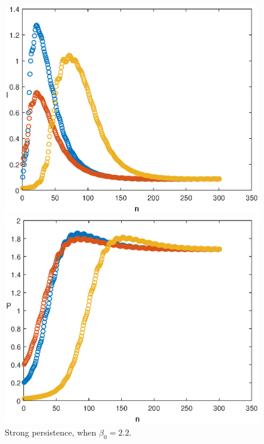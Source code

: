 \documentclass[reqno]{amsart}
\begin{document}
{{\begin{figure}
\begin{minipage}[b]{.32\linewidth}
  \end{minipage}
  \begin{minipage}[b]{.32\linewidth}
        \includegraphics[width=\linewidth]{Infected_PERS_PER.eps}
  \end{minipage}
  \begin{minipage}[b]{.32\linewidth}
        \includegraphics[width=\linewidth]{Predator_PERS_PER.eps}
  \end{minipage}
    \caption{Strong persistence, when $\beta_0=2.2$.}
      \label{fig-no-periodic-DF-1}
\end{figure}

}}
\end{document}
